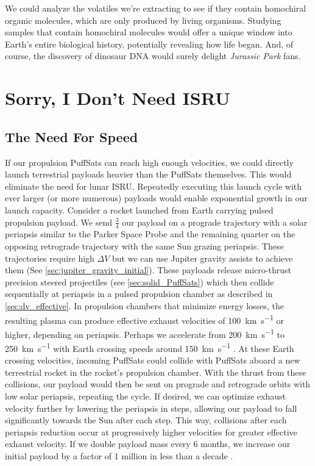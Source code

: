 \documentclass{article}
\begin{document}
{We could analyze the volatiles we're extracting to see if they contain homochiral organic molecules, which are only produced by living organisms.   Studying samples that contain homochiral molecules would offer a unique window into Earth's entire biological history, potentially revealing how life began. And, of course, the discovery of dinosaur DNA would surely delight \textit{Jurassic Park} \cite{jurassic_park} fans.

\section{Sorry, I Don't Need ISRU}
\subsection{The Need For Speed \cite{topgun1986needforspeed}}\label{sec:no_isru_rocket}
If our propulsion PuffSats can reach high enough velocities, we could directly launch terrestrial payloads heavier than the PuffSats themselves.   This would eliminate the need for lunar ISRU. Repeatedly executing this launch cycle with ever larger (or more numerous) payloads would enable exponential growth in our launch capacity. Consider a rocket launched from Earth carrying pulsed propulsion payload.   We send $\frac{3}{4}$ our payload on a prograde trajectory with a solar periapsis similar to the Parker Space Probe and the remaining quarter on the opposing retrograde trajectory with the same Sun grazing periapsis.  These trajectories require high $\Delta V$ but we can use Jupiter gravity assists to achieve them (See \autoref{sec:jupiter_gravity_initial}).   These payloads release micro-thrust precision steered projectiles (see \autoref{sec:solid_PuffSats}) which then collide sequentially at periapsis in a pulsed propulsion chamber as described in \autoref{sec:dv_effective}. In propulsion chambers that minimize energy losses, the resulting plasma can produce effective exhaust velocities of \SI{100}{\kilo\meter\per\second} or higher, depending on periapsis. Perhaps we accelerate from \SI{200}{\kilo\meter\per\second} to \SI{250}{\kilo\meter\per\second} with Earth crossing speeds around \SI{150}{\kilo\meter\per\second} \cite{Katz_aim_is_all_you_need_2025}.  At these Earth crossing velocities, incoming PuffSats could collide with PuffSats aboard a new terrestrial rocket in the rocket's propulsion chamber.  With the thrust from these collisions, our payload would then be sent on prograde and retrograde orbits with low solar periapsis, repeating the cycle.  If desired, we can optimize exhaust velocity further by lowering the periapsis in steps, allowing our payload to fall significantly towards the Sun after each step.  This way, collisions after each periapsis reduction occur at progressively higher velocities for greater effective exhaust velocity.   If we double payload mass every 6 months, we increase our initial payload by a factor of 1 million in less than a decade \cite{Katz_aim_is_all_you_need_2025}. 

}
\end{document}
